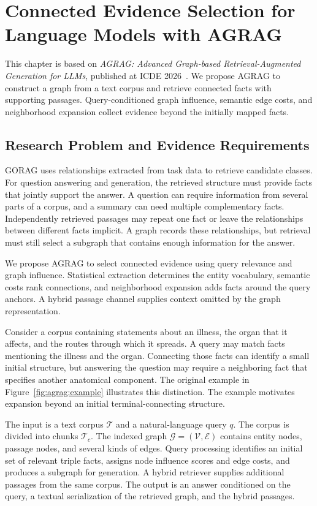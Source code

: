 \chapter{Connected Evidence Selection for Language Models with AGRAG}
\label{ch:agrag}

This chapter is based on \emph{AGRAG: Advanced Graph-based Retrieval-Augmented Generation for LLMs}, published at ICDE 2026~\cite{agrag-paper}. We propose AGRAG to construct a graph from a text corpus and retrieve connected facts with supporting passages. Query-conditioned graph influence, semantic edge costs, and neighborhood expansion collect evidence beyond the initially mapped facts.

\section{Research Problem and Evidence Requirements}
\label{sec:agrag:problem}
GORAG uses relationships extracted from task data to retrieve candidate classes. For question answering and generation, the retrieved structure must provide facts that jointly support the answer. A question can require information from several parts of a corpus, and a summary can need multiple complementary facts. Independently retrieved passages may repeat one fact or leave the relationships between different facts implicit. A graph records these relationships, but retrieval must still select a subgraph that contains enough information for the answer.

We propose AGRAG to select connected evidence using query relevance and graph influence. Statistical extraction determines the entity vocabulary, semantic costs rank connections, and neighborhood expansion adds facts around the query anchors. A hybrid passage channel supplies context omitted by the graph representation.

Consider a corpus containing statements about an illness, the organ that it affects, and the routes through which it spreads. A query may match facts mentioning the illness and the organ. Connecting those facts can identify a small initial structure, but answering the question may require a neighboring fact that specifies another anatomical component. The original example in Figure~\ref{fig:agrag:example} illustrates this distinction. The example motivates expansion beyond an initial terminal-connecting structure.

The input is a text corpus $\mathcal{T}$ and a natural-language query $q$. The corpus is divided into chunks $\mathcal{T}_c$. The indexed graph $\mathcal{G}=(\mathcal{V},\mathcal{E})$ contains entity nodes, passage nodes, and several kinds of edges. Query processing identifies an initial set of relevant triple facts, assigns node influence scores and edge costs, and produces a subgraph for generation. A hybrid retriever supplies additional passages from the same corpus. The output is an answer conditioned on the query, a textual serialization of the retrieved graph, and the hybrid passages.

